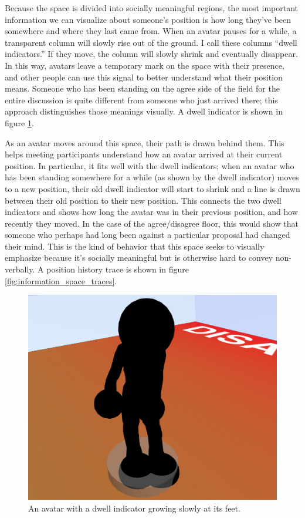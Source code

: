 Because the space is divided into socially meaningful regions, the most important information we can visualize about someone's position is how long they've been somewhere and where they last came from. When an avatar pauses for a while, a transparent column will slowly rise out of the ground. I call these columns ``dwell indicators.'' If they move, the column will slowly shrink and eventually disappear. In this way, avatars leave a temporary mark on the space with their presence, and other people can use this signal to better understand what their position means. Someone who has been standing on the agree side of the field for the entire discussion is quite different from someone who just arrived there; this approach distinguishes those meanings visually. A dwell indicator is shown in figure \ref{fig:information_space_dwell}.

As an avatar moves around this space, their path is drawn behind them. This helps meeting participants understand how an avatar arrived at their current position. In particular, it fits well with the dwell indicators; when an avatar who has been standing somewhere for a while (as shown by the dwell indicator) moves to a new position, their old dwell indicator will start to shrink and a line is drawn between their old position to their new position. This connects the two dwell indicators and shows how long the avatar was in their previous position, and how recently they moved. In the case of the agree/disagree floor, this would show that someone who perhaps had long been against a particular proposal had changed their mind. This is the kind of behavior that this space seeks to visually emphasize because it's socially meaningful but is otherwise hard to convey non-verbally. A position history trace is shown in figure \ref{fig:information_space_traces}.

\begin{figure}[tp]
	\includegraphics{figures/dwell-crop-lower.png}
	\caption{An avatar with a dwell indicator growing slowly at its feet.}
	\label{fig:information_space_dwell}
\end{figure}

